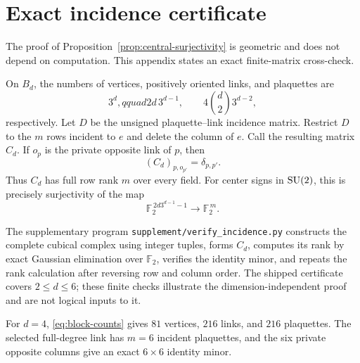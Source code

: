 \section{Exact incidence certificate}
\label{app:incidence}

The proof of Proposition~\ref{prop:central-surjectivity} is geometric and
does not depend on computation.  This appendix states an exact finite-matrix
cross-check.

On $B_d$, the numbers of vertices, positively oriented links, and plaquettes
are
\begin{equation}\label{eq:block-counts}
  3^d,qquad 2d\,3^{d-1},\qquad
  4\binom d2 3^{d-2},
\end{equation}
respectively.  Let $D$ be the unsigned plaquette--link incidence matrix.
Restrict $D$ to the $m$ rows incident to $e$ and delete the column of $e$.
Call the resulting matrix $C_d$.  If $o_p$ is the private opposite link of
$p$, then
\begin{equation}\label{eq:identity-minor}
  (C_d)_{p,o_{p'}}=\delta_{p,p'}.
\end{equation}
Thus $C_d$ has full row rank $m$ over every field.  For center signs in
$\mathrm{SU}(2)$, this is precisely surjectivity of the map
\[
  \mathbb F_2^{\,2d3^{d-1}-1}\longrightarrow\mathbb F_2^{\,m}.
\]

The supplementary program \texttt{supplement/verify\_incidence.py}
constructs the complete cubical complex using integer tuples, forms $C_d$,
computes its rank by exact Gaussian elimination over $\mathbb F_2$, verifies
the identity minor, and repeats the rank calculation after reversing row and
column order.  The shipped certificate covers $2\leq d\leq6$; these finite
checks illustrate the dimension-independent proof and are not logical inputs
to it.

For $d=4$, \eqref{eq:block-counts} gives $81$ vertices, $216$ links, and
$216$ plaquettes.  The selected full-degree link has $m=6$ incident
plaquettes, and the six private opposite columns give an exact $6\times6$
identity minor.

